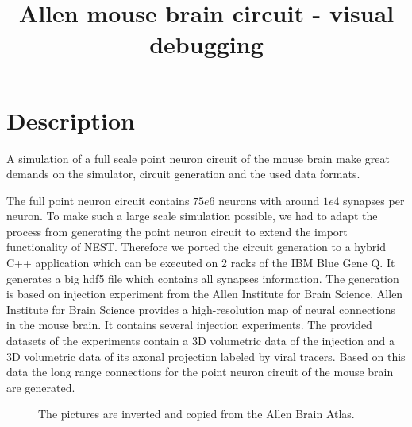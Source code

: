 \documentclass[a4paper]{IEEEtran}
\title{ Allen mouse brain circuit - visual debugging }
\begin{document}
   \maketitle
   
   \section{Description}
   A simulation of a full scale point neuron circuit of the mouse brain make great demands on the simulator, circuit generation and the used data formats.   
   
   The full point neuron circuit contains $75e6$ neurons with around $1e4$ synapses per neuron.
   To make such a large scale simulation possible, we had to adapt the process from generating the point neuron circuit to extend the import functionality of NEST. Therefore we ported the circuit generation to a hybrid C++ application which can be executed on 2 racks of the IBM Blue Gene Q. It generates a big hdf5 file which contains all synapses information. The generation is based on injection experiment from the Allen Institute for
Brain Science.
   Allen Institute for Brain Science provides a high-resolution map of neural connections in the mouse brain.
   It contains several injection experiments. The provided datasets of the experiments 
   contain a 3D volumetric data of the injection and a 3D volumetric data of its axonal projection labeled by viral
   tracers. Based on this data the long range connections for the point neuron circuit of the mouse brain are generated.
  
	 \begin{figure}[ht!]
   	\begin{center}
        \hspace{0.1cm}
    	   \end{center}
    	\caption{%
        The pictures are inverted and copied from the Allen Brain Atlas.
     }%
   \label{fig:atlas}
   \end{figure}  
  
\end{document}
